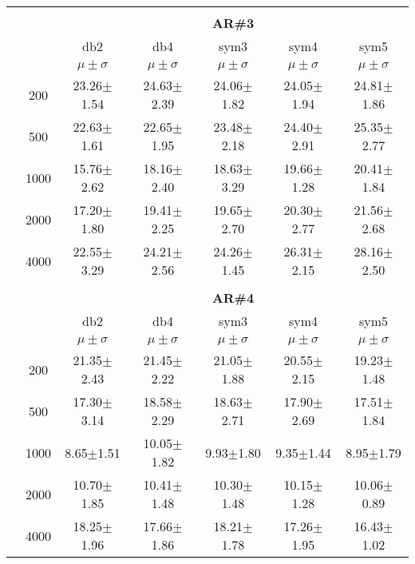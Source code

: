 \begin{table}[H]
\begin{tabular}{|c|c|c c c c c|}
	


\\ \midrule
\multicolumn{7}{c}{}\\ 



\cline{3-7}
\multicolumn{2}{c|}{\multirow{3}{*}{}} & \multicolumn{5}{c|}{\textbf{AR\#3}}   \\\cline{3-7} 

\multicolumn{2}{c|}{}  & db2 & db4 & sym3 & sym4 & sym5 \\\cline{3-7}
\multicolumn{2}{c|}{}& $\mu \pm \sigma$ & $\mu \pm \sigma$ & $\mu \pm \sigma$ & $\mu \pm \sigma$ & $\mu \pm \sigma$ \\\hline

\multicolumn{1}{|c|}{ \multirow{5}{*}{\rotatebox[origin=c]{90}{\textbf{Neurônios}}} }
&200	&23.26$\pm$1.54	&24.63$\pm$2.39	&24.06$\pm$1.82	&24.05$\pm$1.94	&24.81$\pm$1.86	\\\cline{2-7}
&500	&22.63$\pm$1.61	&22.65$\pm$1.95	&23.48$\pm$2.18	&24.40$\pm$2.91	&25.35$\pm$2.77	\\\cline{2-7}
&1000	&15.76$\pm$2.62 &18.16$\pm$2.40	&18.63$\pm$3.29	&19.66$\pm$1.28	&20.41$\pm$1.84	\\\cline{2-7}
&2000	&17.20$\pm$1.80	&19.41$\pm$2.25	&19.65$\pm$2.70	&20.30$\pm$2.77	&21.56$\pm$2.68	\\\cline{2-7}
&4000	&22.55$\pm$3.29	&24.21$\pm$2.56	&24.26$\pm$1.45	&26.31$\pm$2.15	&28.16$\pm$2.50	




\\\midrule 
\multicolumn{7}{c}{}\\ 



\cline{3-7}
\multicolumn{2}{c|}{\multirow{3}{*}{}} & \multicolumn{5}{c|}{\textbf{AR\#4}}   \\\cline{3-7} 

\multicolumn{2}{c|}{}  & db2 & db4 & sym3 & sym4 & sym5 \\\cline{3-7}
\multicolumn{2}{c|}{}& $\mu \pm \sigma$ & $\mu \pm \sigma$ & $\mu \pm \sigma$ & $\mu \pm \sigma$ & $\mu \pm \sigma$ \\\hline

\multicolumn{1}{|c|}{ \multirow{5}{*}{\rotatebox[origin=c]{90}{\textbf{Neurônios}}} }
& 200	&21.35$\pm$2.43	&21.45$\pm$2.22	&21.05$\pm$1.88	&20.55$\pm$2.15	&19.23$\pm$1.48	\\\cline{2-7}
& 500	&17.30$\pm$3.14	&18.58$\pm$2.29	&18.63$\pm$2.71	&17.90$\pm$2.69	&17.51$\pm$1.84	\\\cline{2-7}
& 1000	&8.65$\pm$1.51	&10.05$\pm$1.82	&9.93$\pm$1.80	&9.35$\pm$1.44	&8.95$\pm$1.79	\\\cline{2-7}
& 2000	&10.70$\pm$1.85	&10.41$\pm$1.48	&10.30$\pm$1.48	&10.15$\pm$1.28	&10.06$\pm$0.89	\\\cline{2-7}
& 4000	&18.25$\pm$1.96	&17.66$\pm$1.86	&18.21$\pm$1.78	&17.26$\pm$1.95	&16.43$\pm$1.02	
\\\midrule
	\end{tabular}

\end{table}

